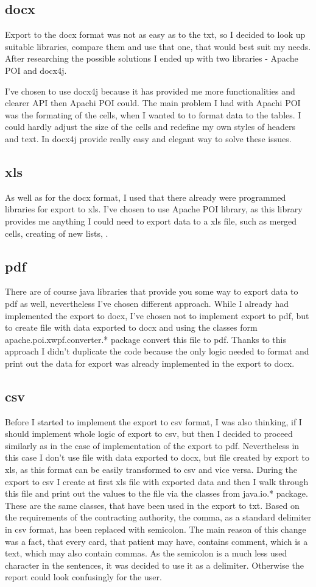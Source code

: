 \documentclass[thesis=B,english]{FITthesis}[2012/10/20]
\begin{document}
\subsection{docx}
Export to the docx format was not as easy as to the txt, so I decided to look up suitable libraries, compare them and use that one, that would best suit my needs. After researching the possible solutions I ended up with two libraries - Apache POI and docx4j.

I've chosen to use docx4j because it has provided me more functionalities and clearer API then Apachi POI could. The main problem I had with Apachi POI was the formating of the cells, when I wanted to to format data to the tables. I could hardly adjust the size of the cells and redefine my own styles of headers and text. In docx4j provide really easy and elegant way to solve these issues.
\subsection{xls}
As well as for the docx format, I used that there already were programmed libraries for export to xls.
I've chosen to use Apache POI library, as this library provides me anything I could need to export data to  a xls file, such as merged cells, creating of new lists, .
\subsection{pdf}
There are of course java libraries that provide you some way to export data to pdf as well, nevertheless I've chosen different approach. While I already had implemented the export to docx, I've chosen not to implement export to pdf, but to create file with data exported to docx and using the classes form apache.poi.xwpf.converter.* package convert this file to pdf. Thanks to this approach I didn't duplicate the code because the only logic needed to format and print out the data for export was already implemented in the export to docx. 
\subsection{csv}
Before I started to implement the export to csv format, I was also thinking, if I should implement whole logic of export to csv, but then I decided to proceed similarly as in the case of implementation of the export to pdf. Nevertheless in this case I don't use file with data exported to docx, but file created by export to xls, as this format can be easily transformed to csv and vice versa. During the export to csv I create at first xls file with exported data and then I walk through this file and print out the values to the file via the classes from java.io.* package. These are the same classes, that have been used in the export to txt. Based on the requirements of the contracting authority, the comma, as a standard delimiter in csv format, has been replaced with semicolon. The main reason of this change was a fact, that every card, that patient may have, contains comment, which is a text, which may also contain commas. As the semicolon is a much less used character in the sentences, it was decided to use it as a delimiter. Otherwise the report could look confusingly for the user.
\end{document}
